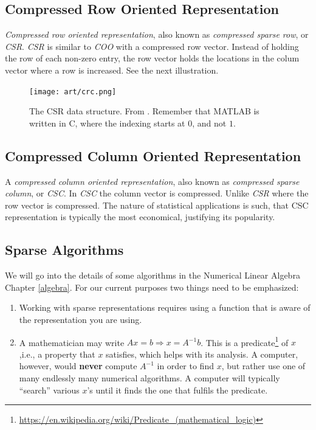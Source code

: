 \documentclass[]{book}
\renewcommand{\href}[2]{#2\footnote{\url{#1}}}
\theoremstyle{definition}
\theoremstyle{definition}
\theoremstyle{definition}
\theoremstyle{remark}
\begin{document}
\hypertarget{compressed-row-oriented-representation}{%
\subsection{Compressed Row Oriented Representation}\label{compressed-row-oriented-representation}}

\emph{Compressed row oriented representation}, also known as \emph{compressed sparse row}, or \emph{CSR}.
\emph{CSR} is similar to \emph{COO} with a compressed row vector.
Instead of holding the row of each non-zero entry, the row vector holds the locations in the colum vector where a row is increased.
See the next illustration.

\begin{figure}
\centering
\texttt{[image: art/crc.png]}
\caption{The CSR data structure. From \citet{shah2004sparse}. Remember that MATLAB is written in C, where the indexing starts at \(0\), and not \(1\).}
\end{figure}

\hypertarget{compressed-column-oriented-representation}{%
\subsection{Compressed Column Oriented Representation}\label{compressed-column-oriented-representation}}

A \emph{compressed column oriented representation}, also known as \emph{compressed sparse column}, or \emph{CSC}.
In \emph{CSC} the column vector is compressed. Unlike \emph{CSR} where the row vector is compressed.
The nature of statistical applications is such, that CSC representation is typically the most economical, justifying its popularity.

\hypertarget{sparse-algorithms}{%
\subsection{Sparse Algorithms}\label{sparse-algorithms}}

We will go into the details of some algorithms in the Numerical Linear Algebra Chapter \ref{algebra}.
For our current purposes two things need to be emphasized:

\begin{enumerate}
\def\labelenumi{\arabic{enumi}.}
\item
  Working with sparse representations requires using a function that is aware of the representation you are using.
\item
  A mathematician may write \(Ax=b \Rightarrow x=A^{-1}b\). This is a \href{https://en.wikipedia.org/wiki/Predicate_(mathematical_logic)}{predicate} of \(x\),i.e., a property that \(x\) satisfies, which helps with its analysis. A computer, however, would \textbf{never} compute \(A^{-1}\) in order to find \(x\), but rather use one of many endlessly many numerical algorithms. A computer will typically ``search'' various \(x\)'s until it finds the one that fulfils the predicate.
\end{enumerate}
\end{document}
